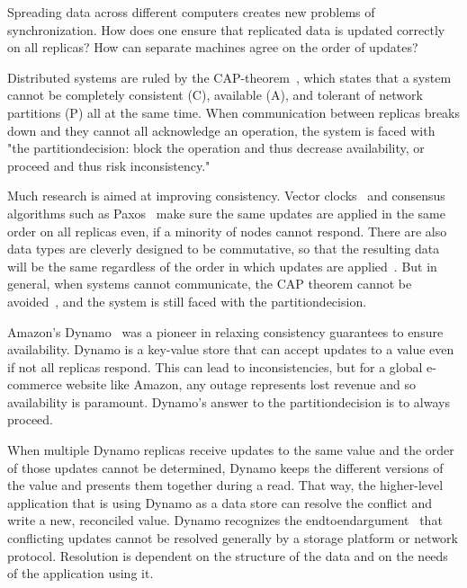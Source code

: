 
Spreading data across different computers creates new problems of
synchronization. How does one ensure that replicated data is updated correctly
on all replicas? How can separate machines agree on the order of updates?

Distributed systems are ruled by the \gls{CAP-theorem}~\cite{cap_origin}, which
states that a system cannot be completely consistent (C), available (A), and
tolerant of network partitions (P) all at the same time. When communication
between replicas breaks down and they cannot all acknowledge an operation, the
system is faced with "the \gls{partitiondecision}: block the operation and thus
decrease availability, or proceed and thus risk
inconsistency."~\cite{cap_years_later}

Much research is aimed at improving consistency. Vector
clocks~\cite{lamport_ordering} and consensus algorithms such as
Paxos~\cite{paxos_made_simple,paxos_made_moderately_complex} make sure the same
updates are applied in the same order on all replicas even, if a minority of
nodes cannot respond. There are also data types are cleverly designed to be
commutative, so that the resulting data will be the same regardless of the order
in which updates are applied~\cite{crdt_orig}. But in general, when systems
cannot communicate, the CAP theorem cannot be avoided~\cite{cap_proof}, and the
system is still faced with the \gls{partitiondecision}.

Amazon's Dynamo~\cite{dynamo} was a pioneer in relaxing consistency guarantees
to ensure availability. Dynamo is a key-value store that can accept updates to a
value even if not all replicas respond. This can lead to inconsistencies, but
for a global e-commerce website like Amazon, any outage represents lost revenue
and so availability is paramount. Dynamo's answer to the \gls{partitiondecision}
is to always proceed.

When multiple Dynamo replicas receive updates to the same value and the order of
those updates cannot be determined, Dynamo keeps the different versions of the
value and presents them together during a read. That way, the higher-level
application that is using Dynamo as a data store can resolve the conflict and
write a new, reconciled value. Dynamo recognizes the
\gls{endtoendargument}~\cite{endtoendargument} that conflicting updates cannot
be resolved generally by a storage platform or network protocol. Resolution is
dependent on the structure of the data and on the needs of the application using
it.

